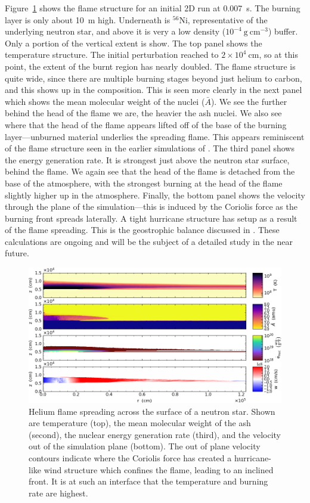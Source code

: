 \documentclass[a4paper]{jpconf}
\newcommand{\isot}[2]{$^{#2}\mathrm{#1}$}
\newcommand{\gcc}{\mathrm{g~cm^{-3} }}
\newcommand{\MarginPar}[1]{\marginpar{\vskip-\baselineskip\raggedright\tiny\sffamily\hrule\smallskip{\color{red}#1}\par\smallskip\hrule}}
\begin{document}
Figure~\ref{fig:xrb} shows the flame structure for an initial 2D run
at 0.007~s.  The burning layer is only about 10~m high.  Underneath is
\isot{Ni}{56}, representative of the underlying neutron star, and
above it is very a low density ($10^{-4}~\gcc$) buffer.  Only a
portion of the vertical extent is show.  The top panel shows the
temperature structure.  The initial perturbation reached to $2\times
10^4~\mathrm{cm}$, so at this point, the extent of the burnt region
has nearly doubled.  The flame structure is quite wide, since there
are multiple burning stages beyond just helium to carbon, and this
shows up in the composition.  This is seen more clearly in the next
panel which shows the mean molecular weight of the nuclei ($\bar{A}$).
We see the further behind the head of the flame we are, the heavier
the ash nuclei.  We also see where that the head of the flame
appears lifted off of the base of the burning layer---unburned
material underlies the spreading flame.  This appears
reminiscent of the flame structure seen in the earlier simulations of
\cite{cavecchi:2012}. \MarginPar{Yuri, would you agree?} The third panel shows the energy generation rate.
It is strongest just above the neutron star surface, behind the flame.
We again see that the head of the flame is detached from the base
of the atmosphere, with the strongest burning at the head of the flame
slightly higher up in the atmosphere.   Finally, the bottom
panel shows the velocity through the plane of the simulation---this is
induced by the Coriolis force as the burning front spreads laterally.
A tight hurricane structure has setup as a result of the flame
spreading.  This is the geostrophic balance discussed in
\cite{SPIT_ETAL02}.    These calculations are ongoing and will be
the subject of a detailed study in the near future.

\begin{figure}
\centering
\includegraphics[width=0.95\linewidth]{xrb}
\caption{\label{fig:xrb} Helium flame spreading across the surface of
  a neutron star.  Shown are temperature (top), the mean molecular
  weight of the ash (second), the nuclear energy generation rate
  (third), and the velocity out of the simulation plane (bottom).  The
  out of plane velocity contours indicate where the Coriolis force has
  created a hurricane-like wind structure which confines the flame,
  leading to an inclined front. It is at such an interface that the
  temperature and burning rate are highest.  }
\end{figure}
\end{document}
